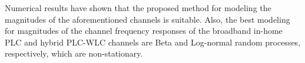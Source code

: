 \documentclass[journal]{IEEEtran}
\begin{document}
Numerical results have shown that the proposed method for modeling the magnitudes of the aforementioned channels is suitable. Also, the best modeling for magnitudes of the channel frequency responses of the broadband in-home \ac{PLC} and hybrid \ac{PLC}-\ac{WLC} channels are Beta and Log-normal random processes, respectively, which are non-stationary. 
 



\end{document}
